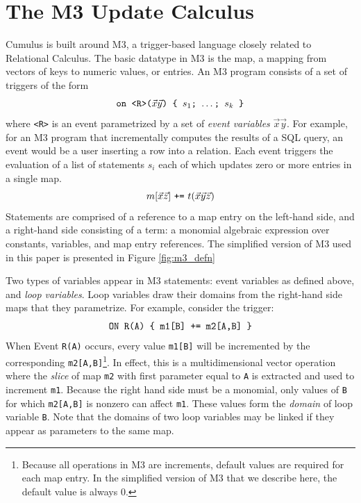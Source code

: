 \documentclass{vldb}
\begin{document}
\section{The M3 Update Calculus}
Cumulus is built around M3, a trigger-based language closely related to Relational Calculus.  The basic datatype in M3 is the map, a mapping from vectors of keys to numeric values, or entries.  An M3 program consists of a set of triggers of the form
\[
\mbox{{\tt on <R>($\vec x \vec y$) \{ $s_1$; $\dots$; $s_k$ \}}}
\]
where {\tt <R>} is an event parametrized by a set of \textit{event variables} $\vec x \vec y$.  For example, for an M3 program that incrementally computes the results of a SQL query, an event would be a user inserting a row into a relation.  Each event triggers the evaluation of a list of statements $s_i$ each of which updates zero or more entries in a single map.
\[
\mbox{$m[\vec{x}\vec{z}]$ {\tt +=} $t(\vec x \vec y \vec z)$}
\]
Statements are comprised of a reference to a map entry on the left-hand side, and a right-hand side consisting of a term: a monomial algebraic expression over constants, variables, and map entry references.  The simplified version of M3 used in this paper is presented in Figure \ref{fig:m3_defn}

Two types of variables appear in M3 statements: event variables as defined above, and \textit{loop variables}.  Loop variables draw their domains from the right-hand side maps that they parametrize.  For example, consider the trigger:
\[
\mbox{\texttt{ON R(A) \{ m1[B] += m2[A,B] \}}}
\]
When Event \texttt{R(A)} occurs, every value \texttt{m1[B]} will be incremented by the corresponding \texttt{m2[A,B]}\footnote{Because all operations in M3 are increments, default values are required for each map entry.  In the simplified version of M3 that we describe here, the default value is always 0.}.  In effect, this is a multidimensional vector operation where the \textit{slice} of map \texttt{m2} with first parameter equal to \texttt{A} is extracted and used to increment \texttt{m1}.  Because the right hand side must be a monomial, only values of \texttt{B} for which \texttt{m2[A,B]} is nonzero can affect \texttt{m1}.  These values form the \textit{domain} of loop variable \texttt{B}.  Note that the domains of two loop variables may be linked if they appear as parameters to the same map.

\end{document}
